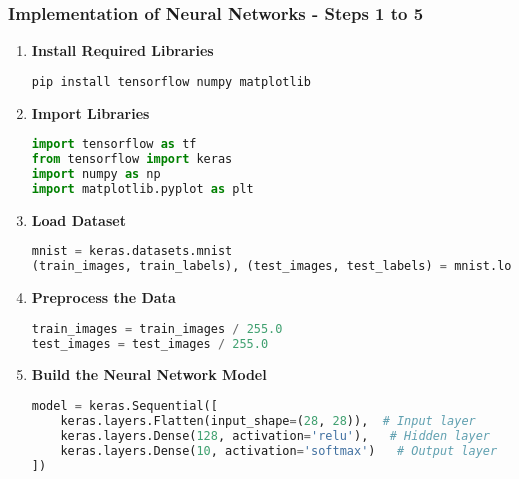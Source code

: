 \documentclass[aspectratio=169]{beamer}
\begin{document}
\begin{frame}[fragile]
    \frametitle{Implementation of Neural Networks - Steps 1 to 5}
    \begin{enumerate}
        \item \textbf{Install Required Libraries}
            \begin{lstlisting}[language=bash]
pip install tensorflow numpy matplotlib
            \end{lstlisting}
        \item \textbf{Import Libraries}
            \begin{lstlisting}[language=Python]
import tensorflow as tf
from tensorflow import keras
import numpy as np
import matplotlib.pyplot as plt
            \end{lstlisting}
        \item \textbf{Load Dataset}
            \begin{lstlisting}[language=Python]
mnist = keras.datasets.mnist
(train_images, train_labels), (test_images, test_labels) = mnist.load_data()
            \end{lstlisting}
        \item \textbf{Preprocess the Data}
            \begin{lstlisting}[language=Python]
train_images = train_images / 255.0
test_images = test_images / 255.0
            \end{lstlisting}
        \item \textbf{Build the Neural Network Model}
            \begin{lstlisting}[language=Python]
model = keras.Sequential([
    keras.layers.Flatten(input_shape=(28, 28)),  # Input layer
    keras.layers.Dense(128, activation='relu'),   # Hidden layer
    keras.layers.Dense(10, activation='softmax')   # Output layer
])
            \end{lstlisting}
    \end{enumerate}
\end{frame}
\end{document}
